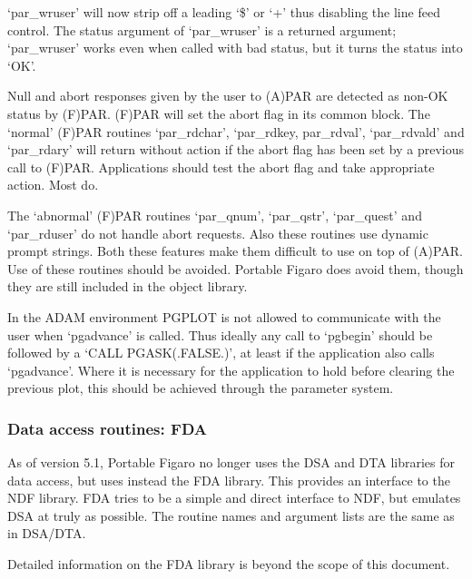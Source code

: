    `par\_wruser' will now strip off a leading `\$' or `+' thus disabling
   the line feed control. The status argument of `par\_wruser' is a
   returned argument; `par\_wruser' works even when called with bad
   status, but it turns the status into `OK'.

   Null and abort responses given by the user to (A)PAR are detected
   as non-OK status by (F)PAR. (F)PAR will set the abort flag in its
   common block. The `normal' (F)PAR routines `par\_rdchar', `par\_rdkey,
   par\_rdval', `par\_rdvald' and `par\_rdary' will return without action
   if the abort flag has been set by a previous call to (F)PAR.
   Applications should test the abort flag and take appropriate action.
   Most do.

   The `abnormal' (F)PAR routines `par\_qnum', `par\_qstr', `par\_quest'
   and `par\_rduser' do not handle abort requests.  Also these routines
   use dynamic prompt strings.  Both these features make them difficult
   to use on top of (A)PAR.  Use of these routines should be avoided.
   Portable Figaro does avoid them, though they are still included in
   the object library.

   In the ADAM environment PGPLOT is not allowed to communicate with the
   user when `pgadvance' is called.  Thus ideally any call to `pgbegin'
   should be followed by a `CALL PGASK(.FALSE.)', at least if the
   application also calls `pgadvance'.  Where it is necessary for the
   application to hold before clearing the previous plot, this should be
   achieved through the parameter system.


\subsubsection{\label{changessub5a}Data access routines: FDA}

   As of version 5.1, Portable Figaro no longer uses the DSA and DTA
   libraries for data access, but uses instead the FDA library. This
   provides an interface to the NDF library. FDA tries to be a simple
   and direct interface to NDF, but emulates DSA at truly as
   possible. The routine names and argument lists are the same as in
   DSA/DTA.

   Detailed information on the FDA library is beyond the scope of this
   document.


